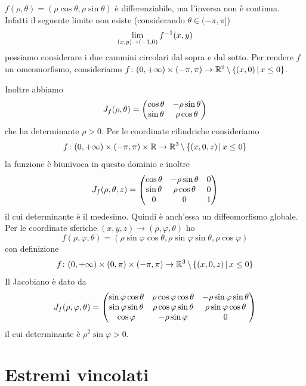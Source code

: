 \documentclass[a4paper]{article}
\begin{document}
\(f(\rho, \theta) = (\rho\cos\theta,\rho\sin\theta)\) è differenziabile,
ma l'inversa non è continua. Infatti il seguente limite non esiste (considerando \(\theta \in (-\pi, \pi]\))
\[
    \lim_{(x,y) \to (-1,0)} f^{-1}(x,y)
\]
possiamo considerare i due cammini circolari dal sopra e dal sotto.
Per rendere \(f\) un omeomorfismo, consideriamo
\(f \colon (0, +\infty) \times (-\pi, \pi) \to \mathbb{R}^2 \,\backslash\, \{(x,0) \,|\, x \leq 0\}\).
\\
\begin{radioactive}
Inoltre abbiamo
\[
    J_f(\rho,\theta) = \begin{pmatrix}
        \cos\theta & -\rho\sin\theta \\
        \sin\theta & \rho\cos\theta
    \end{pmatrix}
\]
che ha determinante \(\rho>0\).
Per le coordinate cilindriche consideriamo
\[
    f\colon (0,+\infty) \times (-\pi, \pi)
    \times \mathbb{R} \to \mathbb{R}^3 \,\backslash\, \{(x, 0, z) \,|\, x \leq 0\}
\]
la funzione è biunivoca in questo dominio e inoltre
\[
    J_f(\rho,\theta, z) = \begin{pmatrix}
        \cos\theta & -\rho\sin\theta & 0 \\
        \sin\theta & \rho\cos\theta & 0 \\
        0 & 0 & 1
    \end{pmatrix}
\]
il cui determinante è il medesimo.
Quindi è anch'essa un diffeomorfismo globale.
Per le coordinate sferiche \((x,y,z) \to (\rho, \varphi, \theta)\) ho
\[
    f(\rho,\varphi,\theta) = (\rho\sin\varphi\cos\theta, \rho\sin\varphi\sin\theta,\rho\cos\varphi)
\]
con definizione
\[
    f\colon (0,+\infty) \times (0, \pi) \times (-\pi, \pi)
    \to
    \mathbb{R}^3 \,\backslash\, \{(x,0,z) \,|\, x \leq 0\}
\]
Il Jacobiano è dato da
\[
    J_f(\rho,\varphi,\theta) = \begin{pmatrix}
        \sin\varphi\cos\theta & \rho\cos\varphi\cos\theta & -\rho\sin\varphi\sin\theta \\
        \sin\varphi\sin\theta & \rho\cos\varphi\sin\theta & \rho\sin\varphi\cos\theta \\
        \cos\varphi & -\rho\sin\varphi & 0
    \end{pmatrix}
\]
il cui determinante è \(\rho^2 \sin\varphi > 0\).
\end{radioactive}

\pagebreak

\section{Estremi vincolati}
\end{document}
